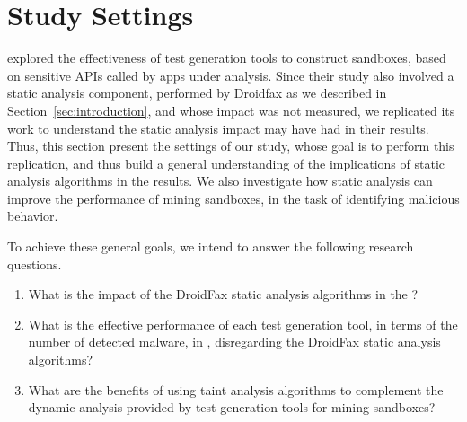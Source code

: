\section{Study Settings}


\blls explored the effectiveness of test generation tools to construct sandboxes, based on sensitive APIs called by apps under analysis. Since their study also involved a static analysis component, performed by Droidfax as we described in Section~\ref{sec:introduction}, and whose impact was not measured, we replicated its work to understand the static analysis impact may have had in their results. Thus, this section present the settings of our study, whose goal is to perform this replication, and thus build a general understanding of the implications of static analysis algorithms in the results. We also investigate how static analysis can improve the performance of mining sandboxes, in the task of identifying malicious behavior.

To achieve these general goals, we intend to answer the following research questions.

\begin{enumerate}[(RQ1)]
 
 \item What is the impact of the DroidFax static analysis algorithms in the \blls?
  
 \item What is the effective performance of each test generation tool, in terms of the number of detected malware, in \blls, disregarding the DroidFax
  static analysis algorithms?

 \item What are the benefits of using taint
 analysis algorithms to complement the dynamic analysis provided by test generation tools for mining sandboxes?
\end{enumerate}



